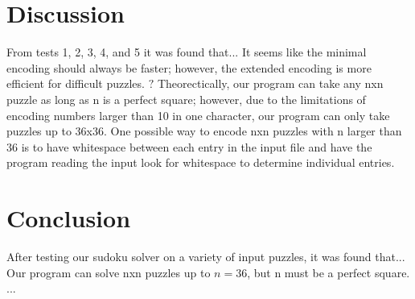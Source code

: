 \documentclass[conference,draftclsnofoot]{IEEEtran}
\begin{document}
\section{Discussion}
From tests 1, 2, 3, 4, and 5 it was found that...  It seems like the minimal
encoding should always be faster; however, the extended encoding is more
efficient for difficult puzzles. \(?\)
Theorectically, our program can take any nxn puzzle as long as n is a perfect
square; however, due to the limitations of encoding numbers larger than 10 in
one character, our program can only take puzzles up to 36x36. One possible way
to encode nxn puzzles with n larger than 36 is to have whitespace between each
entry in the input file and have the program reading the input look for
whitespace to determine individual entries.

\section{Conclusion}
After testing our sudoku solver on a variety of input puzzles, it was found
that...  Our program can solve nxn puzzles up to $n=36$, but n must be a
perfect square.  ...
\end{document}
